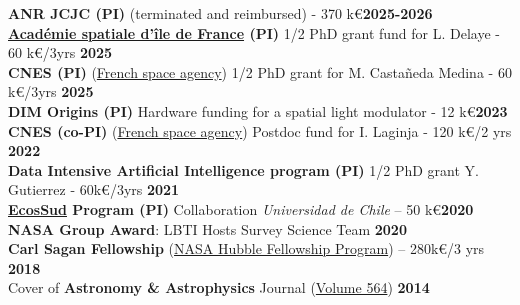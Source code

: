 \documentclass[11pt]{article}
\begin{document}
\vspace{-0.25cm}
\textbf{ANR JCJC (PI)} (terminated and reimbursed) - 370 k\euro\hfill \textbf{2025-2026}\\ 

\vspace{-0.25cm}
\textbf{\href{https://academiespatiale.fr/index.php/a-propos/porteurs-projet/}{Académie spatiale d'île de France} (PI)} 1/2 PhD grant fund for L. Delaye - 60 k\euro/3yrs \hfill \textbf{2025}\\ 

\vspace{-0.25cm}
\textbf{CNES (PI)}  (\href{https://cnes.fr/en/phd-postdoc-grants}{French space agency}) 1/2 PhD grant for M. Castañeda Medina - 60 k\euro/3yrs \hfill \textbf{2025}\\ 

\vspace{-0.25cm}
\textbf{DIM Origins (PI)} Hardware funding for a spatial light modulator - 12 k\euro \hfill \textbf{2023}\\ 

\vspace{-0.25cm}
\textbf{CNES (co-PI)} (\href{https://cnes.fr/en/phd-postdoc-grants}{French space agency}) Postdoc fund for I. Laginja - 120 k\euro/2 yrs \hfill \textbf{2022}\\ 

\vspace{-0.25cm}
\textbf{Data Intensive Artificial Intelligence program (PI)} 1/2 PhD grant Y. Gutierrez - 60k\euro/3yrs \hfill \textbf{2021}\\ 

\vspace{-0.25cm}
\textbf{\href{https://www.univ-paris13.fr/ecos-sud/}{EcosSud} Program (PI)} Collaboration {\it Universidad de Chile} -- 50 k\euro \hfill   \textbf{2020}\\ %

\vspace{-0.25cm}
\textbf{NASA Group Award}: LBTI Hosts Survey Science Team \hfill   \textbf{2020}\\ 

\vspace{-0.25cm}
\textbf{Carl Sagan Fellowship} (\href{http://www.stsci.edu/stsci-research/fellowships/nasa-hubble-fellowship-program}{NASA Hubble Fellowship Program}) -- 280k\euro/3 yrs \hfill   \textbf{2018}\\

\vspace{-0.25cm}
Cover of \textbf{Astronomy \& Astrophysics} Journal (\href{https://www.aanda.org/articles/aa/abs/2014/04/contents/contents.html}{Volume 564}) \hfill  \textbf{2014}\\
\end{document}
